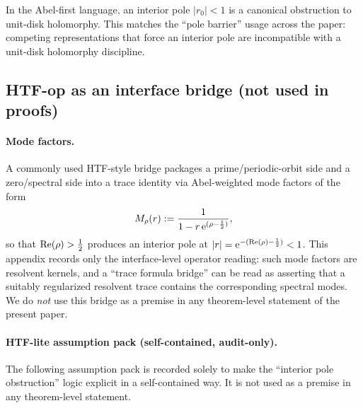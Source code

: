 \begin{remark}\label{rem:interior_pole_obstruction_operator}
\AuditTag In the Abel-first language, an interior pole $|r_0|<1$ is a canonical obstruction to unit-disk holomorphy.
This matches the ``pole barrier'' usage across the paper: competing representations that force an interior pole are incompatible with a unit-disk holomorphy discipline.
\end{remark}

\subsection{HTF-op as an interface bridge (not used in proofs)}
\label{subsec:operator_mother_space_htf}

\paragraph{Mode factors.}
\AuditTag A commonly used HTF-style bridge packages a prime/periodic-orbit side and a zero/spectral side into a trace identity via Abel-weighted mode factors of the form
\[
M_\rho(r):=\frac{1}{1-r\,\mathrm{e}^{(\rho-\frac12)}},
\]
so that $\operatorname{Re}(\rho)>\tfrac12$ produces an interior pole at $|r|=\mathrm{e}^{-(\operatorname{Re}(\rho)-\frac12)}<1$.
This appendix records only the interface-level operator reading: such mode factors are resolvent kernels, and a ``trace formula bridge'' can be read as asserting that a suitably regularized resolvent trace contains the corresponding spectral modes.
We do \emph{not} use this bridge as a premise in any theorem-level statement of the present paper.

\paragraph{HTF-lite assumption pack (self-contained, audit-only).}
\AuditTag The following assumption pack is recorded solely to make the ``interior pole obstruction'' logic explicit in a self-contained way.
It is not used as a premise in any theorem-level statement.

